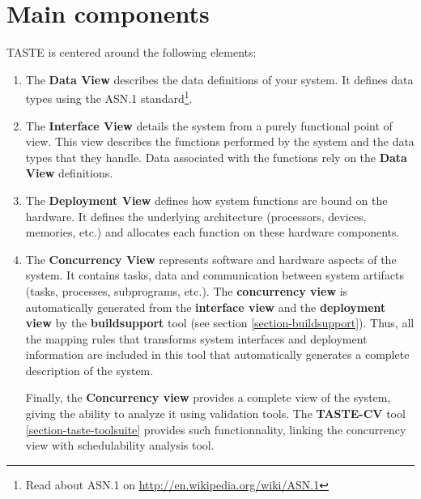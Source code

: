 \documentclass[11pt]{book}
\newcommand{\Concept}[1]{#1\xspace}
\newcommand{\taste}{\Concept{TASTE}}
\begin{document}
   \section{Main components}
   \taste is centered around the following elements:
   \begin{enumerate}
      \item
         The \textbf{Data View} describes the data definitions of your system. It
         defines data types using the ASN.1 standard\footnote{Read about ASN.1 on \url{http://en.wikipedia.org/wiki/ASN.1}}.
      \item
         The \textbf{Interface View} details the system from a purely functional
         point of view. This view describes the functions performed by the
         system and the data types that they handle. Data associated with the
         functions rely on the \textbf{Data View} definitions.
      \item
         The \textbf{Deployment View} defines how system functions are bound on
         the hardware. It defines the underlying architecture (processors,
         devices, memories, etc.) and allocates each function on these hardware
         components.
      \item
         The \textbf{Concurrency View} represents software and hardware aspects
         of the system. It contains tasks, data and communication between system
         artifacts (tasks, processes, subprograms, etc.). The
         \textbf{concurrency view} is automatically generated from the
         \textbf{interface view} and the \textbf{deployment view} by the
         \textbf{buildsupport} tool (see section \ref{section-buildsupport}).
         Thus, all the mapping rules that transforms system interfaces and deployment
         information are included in this tool that automatically generates a
         complete description of the system.

         Finally, the \textbf{Concurrency view} provides a complete view of the
         system, giving the ability to analyze it using validation tools.
         The \textbf{TASTE-CV} tool \ref{section-taste-toolsuite} provides such functionnality, linking the
         concurrency view with schedulability analysis tool.
   \end{enumerate}
\end{document}
